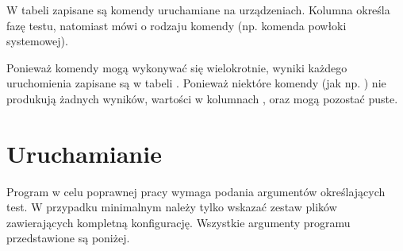 \documentclass[00-praca-magisterska.tex]{subfiles}
\begin{document}
W tabeli  zapisane są komendy uruchamiane na urządzeniach.
Kolumna  określa fazę testu, natomiast  mówi o rodzaju
komendy (np. komenda powłoki systemowej).

Ponieważ komendy mogą wykonywać się wielokrotnie, wyniki każdego uruchomienia
zapisane są w tabeli . Ponieważ niektóre komendy (jak np.
) nie produkują żadnych wyników, wartości w kolumnach
,  oraz  mogą pozostać puste.

\label{arete-master-run}
\section{Uruchamianie}

Program  w celu poprawnej pracy wymaga podania argumentów
określających test. W przypadku minimalnym należy tylko wskazać zestaw plików
zawierających kompletną konfigurację. Wszystkie argumenty programu przedstawione
są poniżej.
\end{document}
